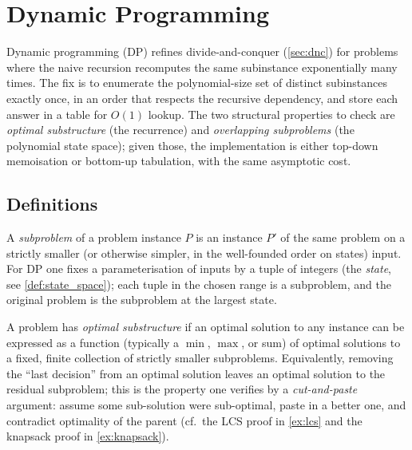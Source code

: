\section{Dynamic Programming}
\label{sec:dp}

Dynamic programming (DP) refines divide-and-conquer (\cref{sec:dnc}) for problems where the naive recursion recomputes the same subinstance exponentially many times. The fix is to enumerate the polynomial-size set of distinct subinstances exactly once, in an order that respects the recursive dependency, and store each answer in a table for $O(1)$ lookup. The two structural properties to check are \emph{optimal substructure} (the recurrence) and \emph{overlapping subproblems} (the polynomial state space); given those, the implementation is either top-down memoisation or bottom-up tabulation, with the same asymptotic cost.

\subsection{Definitions}

\begin{definition}[Subproblem]
\label{def:subproblem}
A \emph{subproblem} of a problem instance $P$ is an instance $P'$ of the same problem on a strictly smaller (or otherwise simpler, in the well-founded order on states) input. For DP one fixes a parameterisation of inputs by a tuple of integers (the \emph{state}, see \cref{def:state_space}); each tuple in the chosen range is a subproblem, and the original problem is the subproblem at the largest state.
\end{definition}

\begin{definition}
\label{def:optimal_substructure}
A problem has \emph{optimal substructure} if an optimal solution to any instance can be expressed as a function (typically a $\min$, $\max$, or sum) of optimal solutions to a fixed, finite collection of strictly smaller subproblems. Equivalently, removing the ``last decision'' from an optimal solution leaves an optimal solution to the residual subproblem; this is the property one verifies by a \emph{cut-and-paste} argument: assume some sub-solution were sub-optimal, paste in a better one, and contradict optimality of the parent (cf.\ the LCS proof in \cref{ex:lcs} and the knapsack proof in \cref{ex:knapsack}).
\end{definition}

